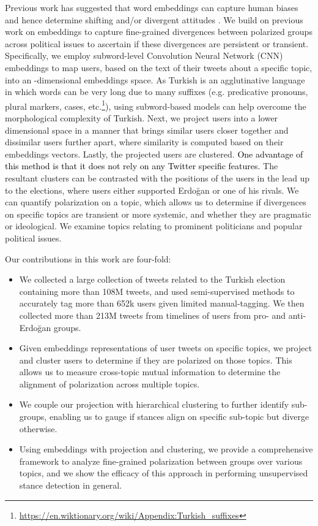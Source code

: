 \documentclass[letterpaper]{article} \usepackage{aaai20}  \usepackage{times}  \usepackage{stackengine}
\newcommand{\kareem}{\textcolor{black}}
\begin{document}
Previous work has suggested that word embeddings can capture human biases \citep{caliskan2017semantics} and hence determine shifting and/or divergent attitudes \citep{garg2018word,giatsoglou2017sentiment}.  
We build on previous work on embeddings to capture fine-grained divergences between polarized groups across political issues to ascertain if these divergences are persistent or transient. Specifically, we employ subword-level Convolution Neural Network (CNN) embeddings to map users, based on the text of their tweets about a specific topic, into an -dimensional embeddings space.
As Turkish is an agglutinative language in which words can be very long due to many suffixes (e.g. predicative pronouns, plural markers, cases, etc.\footnote{\url{https://en.wiktionary.org/wiki/Appendix:Turkish_suffixes}}), using subword-based models can help overcome the morphological complexity of Turkish. Next, we project users into a lower dimensional space in a manner that brings similar users closer together and dissimilar users further apart, where similarity is computed based on their embeddings vectors. Lastly, the projected users are clustered. \kareem{One advantage of this method is that it does not rely on any Twitter specific features.} The resultant clusters can be contrasted with the positions of the users in the lead up to the elections, where users either supported Erdo\u{g}an or one of his rivals. We can quantify polarization on a topic, which allows us to determine if divergences on specific topics are transient or more systemic, and whether they are pragmatic or ideological. We examine topics relating to prominent politicians and popular political issues. 





Our contributions in this work are four-fold:
\begin{itemize}
    \item We collected a large collection of tweets related to the Turkish election containing more than 108M tweets, and used semi-supervised methods to accurately tag more than 652k users given limited manual-tagging. We then collected more than 213M tweets from timelines of users from pro- and anti-Erdo\u{g}an groups.
    \item Given embeddings representations of user tweets on specific topics, we project and cluster users to determine if they are polarized on those topics. This allows us to measure cross-topic mutual information to determine the alignment of polarization across multiple topics. \item We couple our projection with hierarchical clustering to further identify sub-groups, enabling us to gauge if stances align on specific sub-topic but diverge otherwise.
    \item Using embeddings with projection and clustering, we provide a comprehensive framework to analyze fine-grained polarization between groups over various topics, and we show the efficacy of this approach in performing unsupervised stance detection in general. \end{itemize}
\end{document}
